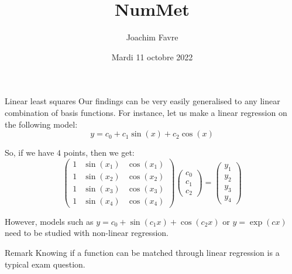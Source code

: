 \documentclass[a4paper]{article}
\title{NumMet}
\author{Joachim Favre}
\date{Mardi 11 octobre 2022}
\begin{document}
\maketitle


\begin{parag}{Linear least squares}
    Our findings can be very easily generalised to any linear combination of basis functions. 
    For instance, let us make a linear regression on the following model: 
    \[y = c_0 + c_1 \sin\left(x\right) + c_2 \cos\left(x\right)\]
    
    So, if we have $4$ points, then we get: 
    \[\begin{pmatrix} 1 & \sin\left(x_1\right) & \cos\left(x_1\right) \\ 1 & \sin\left(x_2\right) & \cos\left(x_2\right) \\ 1 & \sin\left(x_3\right) & \cos\left(x_3\right) \\ 1 & \sin\left(x_4\right) & \cos\left(x_4\right) \end{pmatrix} \begin{pmatrix} c_0 \\ c_1 \\ c_2 \end{pmatrix} = \begin{pmatrix} y_1 \\ y_2 \\ y_3 \\ y_4 \end{pmatrix} \]
    
    However, models such as $y = c_0 + \sin\left(c_1 x\right)+ \cos\left(c_2 x\right)$ or $y = \exp\left(cx\right)$ need to be studied with non-linear regression.

    \begin{subparag}{Remark}
        Knowing if a function can be matched through linear regression is a typical exam question.
    \end{subparag}
\end{parag}
\end{document}
